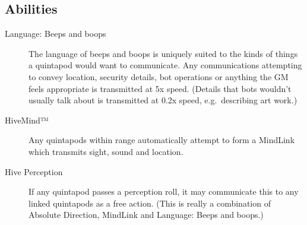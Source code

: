 

\subsection{Abilities}
\label{sec:abilities}

\begin{description}
\item[Language: Beeps and boops] The language of beeps and boops is uniquely
  suited to the kinds of things a quintapod would want to communicate. Any
  communications attempting to convey location, security details, bot operations
  or anything the GM feels appropriate is transmitted at 5x speed. (Details that
  bots wouldn't usually talk about is transmitted at 0.2x speed, e.g.~describing
  art work.)
\item[HiveMind™] Any quintapods within range automatically attempt to form a
  MindLink which transmits sight, sound and location.
\item[Hive Perception] If any quintapod passes a perception roll, it may
  communicate this to any linked quintapods as a free action. (This is really a
  combination of Absolute Direction, MindLink and Language: Beeps and boops.)
\end{description}



\GCPrintCharacter
\ResetCharacterKey



